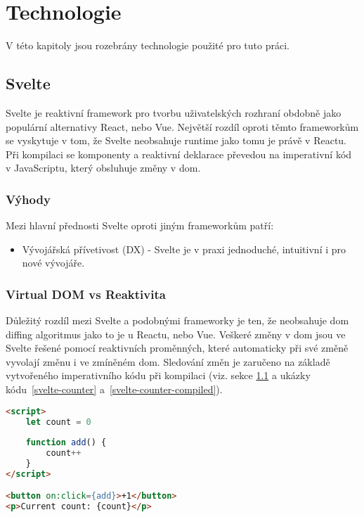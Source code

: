 \chapter{Technologie}

V této kapitoly jsou rozebrány technologie použité pro tuto práci.

\section{Svelte}\label{sec:Svelte}

Svelte je reaktivní framework pro tvorbu uživatelských rozhraní obdobně jako populární alternativy React, nebo Vue.
Největší rozdíl oproti těmto frameworkům se vyskytuje v tom, že Svelte neobsahuje runtime jako tomu je právě v Reactu.
Při kompilaci se komponenty a reaktivní deklarace převedou na imperativní kód v JavaScriptu, který obsluhuje změny v \gls{dom}.

\subsection{Výhody}

Mezi hlavní přednosti Svelte oproti jiným frameworkům patří:

\begin{itemize}
    \item Vývojářská přívetivost (DX) - Svelte je v praxi jednoduché, intuitivní i pro nové vývojáře.
\end{itemize}

\clearpage

\subsection{Virtual DOM vs Reaktivita}

Důležitý rozdíl mezi Svelte a podobnými frameworky je ten, že neobsahuje \gls{dom} diffing algoritmus jako to je u Reactu, nebo Vue.
Veškeré změny v \gls{dom} jsou ve Svelte řešené pomocí reaktivních proměnných, které automaticky při své změně vyvolají změnu i ve zmíněném \gls{dom}.
Sledování změn je zaručeno na základě vytvořeného imperativního kódu při kompilaci (viz. sekce \ref{sec:Svelte} a ukázky kódu~\ref{svelte-counter} a~\ref{svelte-counter-compiled}).

\begin{lstlisting}[caption={Počítadlo ve Svelte}, label={svelte-counter}, language=html]
<script>
	let count = 0
	
	function add() {
		count++
	}
</script>

<button on:click={add}>+1</button>
<p>Current count: {count}</p>
\end{lstlisting}

